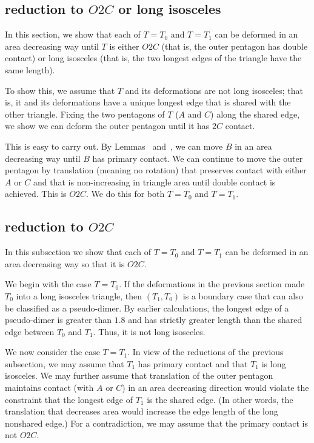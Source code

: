 \subsection{reduction to $O2C$ or long isosceles}

In this section, we show that each of $T=T_0$ and $T=T_1$ can be
deformed in an area decreasing way until $T$ is either $O2C$ (that is,
the outer pentagon has double contact) or long isosceles (that is, the
two longest edges of the triangle have the same length).

To show this, we assume that $T$ and its deformations are not long
isosceles; that is, it and its deformations have a unique longest edge
that is shared with the other triangle.  Fixing the two pentagons of
$T$ ($A$ and $C$) along the shared edge, we show we can deform the
outer pentagon until it has $2C$ contact.

This is easy to carry out.  By Lemmas~
and~, we can move $B$ in an area decreasing way
until $B$ has primary contact.  We can continue to move the outer
pentagon by translation (meaning no rotation) that preserves contact
with either $A$ or $C$ and that is non-increasing in triangle area
until double contact is achieved.  This is $O2C$.  We do this for both
$T=T_0$ and $T=T_1$.

\subsection{reduction to $O2C$}

In this subsection we show that each of $T=T_0$ and $T=T_1$ can be
deformed in an area decreasing way so that it is $O2C$.

We begin with the case $T=T_0$.  If the deformations in the previous
section made $T_0$ into a long isosceles triangle, then $(T_1,T_0)$ is
a boundary case that can also be classified as a pseudo-dimer.  By
earlier calculations, the longest edge of a pseudo-dimer is greater
than $1.8$ and has strictly greater length than the shared edge
between $T_0$ and $T_1$.  Thus, it is not long isosceles.

We now consider the case $T=T_1$.  In view of the reductions of the
previous subsection, we may assume that $T_1$ has primary contact and
that $T_1$ is long isosceles.  We may further assume that translation
of the outer pentagon maintains contact (with  $A$ or $C$)
in an area decreasing direction would violate the constraint that the
longest edge of $T_1$ is the shared edge.  (In other words, the
translation that decreases area would increase the edge length of the
long nonshared edge.)  For a contradiction, we may assume that the
primary contact is not $O2C$.

